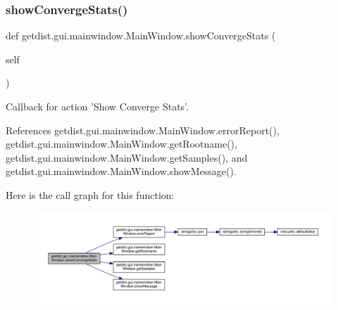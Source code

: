 \mbox{\label{classgetdist_1_1gui_1_1mainwindow_1_1MainWindow_a4c0ed0535d70f1a3587c83d3ab38465e}} 
\subsubsection{\texorpdfstring{show\+Converge\+Stats()}{showConvergeStats()}}
{\footnotesize\ttfamily def getdist.\+gui.\+mainwindow.\+Main\+Window.\+show\+Converge\+Stats (\begin{DoxyParamCaption}\item[{}]{self }\end{DoxyParamCaption})}

\begin{DoxyVerb}Callback for action 'Show Converge Stats'.
\end{DoxyVerb}
 

References getdist.\+gui.\+mainwindow.\+Main\+Window.\+error\+Report(), getdist.\+gui.\+mainwindow.\+Main\+Window.\+get\+Rootname(), getdist.\+gui.\+mainwindow.\+Main\+Window.\+get\+Samples(), and getdist.\+gui.\+mainwindow.\+Main\+Window.\+show\+Message().

Here is the call graph for this function\+:
\nopagebreak
\begin{figure}[H]
\begin{center}
\leavevmode
\includegraphics[width=350pt]{classgetdist_1_1gui_1_1mainwindow_1_1MainWindow_a4c0ed0535d70f1a3587c83d3ab38465e_cgraph}
\end{center}
\end{figure}
\mbox{\label{classgetdist_1_1gui_1_1mainwindow_1_1MainWindow_a91b3c81902c45328fe0fa805ba6f06c3}} 
